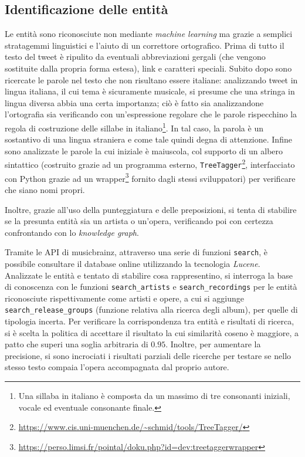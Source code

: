 \documentclass[12pt, a4paper, twocolumn]{article} %
\begin{document}
\subsection{Identificazione delle entità}
Le entità sono riconosciute non mediante \textit{machine learning} ma grazie a semplici stratagemmi linguistici e l'aiuto di un correttore ortografico.
Prima di tutto il testo del tweet è ripulito da eventuali abbreviazioni gergali (che vengono sostituite dalla propria forma estesa), link e caratteri speciali.
Subito dopo sono ricercate le parole nel testo che non risultano essere italiane: analizzando tweet in lingua italiana, il cui tema è sicuramente musicale, si presume che una stringa in lingua diversa abbia una certa importanza; ciò è fatto sia analizzandone l'ortografia sia verificando con un'espressione regolare che le parole rispecchino la regola di costruzione delle sillabe in italiano\footnote{Una sillaba in italiano è composta da un massimo di tre consonanti iniziali, vocale ed eventuale consonante finale.}.
In tal caso, la parola è un sostantivo di una lingua straniera e come tale quindi degna di attenzione.
Infine sono analizzate le parole la cui iniziale è maiuscola, col supporto di un albero sintattico (costruito grazie ad un programma esterno, \verb|TreeTagger|\footnote{\url{https://www.cis.uni-muenchen.de/~schmid/tools/TreeTagger/}}, interfacciato con Python grazie ad un wrapper\footnote{\url{https://perso.limsi.fr/pointal/doku.php?id=dev:treetaggerwrapper}} fornito dagli stessi sviluppatori) per verificare che siano nomi propri.

Inoltre, grazie all'uso della punteggiatura e delle preposizioni, si tenta di stabilire se la presunta entità sia un artista o un'opera, verificando poi con certezza confrontando con lo \textit{knowledge graph}. \newline

Tramite le API di musicbrainz, attraverso una serie di funzioni \verb|search|, è possibile consultare il database online utilizzando la tecnologia \textit{Lucene}.
Analizzate le entità e tentato di stabilire cosa rappresentino, si interroga la base di conoscenza con le funzioni \verb|search_artists| e \verb|search_recordings| per le entità riconosciute rispettivamente come artisti e opere, a cui si aggiunge \verb|search_release_groups| (funzione relativa alla ricerca degli album), per quelle di tipologia incerta.
Per verificare la corrispondenza tra entità e risultati di ricerca, si è scelta la politica di accettare il risultato la cui similarità coseno è maggiore, a patto che superi una soglia arbitraria di $0.95$.
Inoltre, per aumentare la precisione, si sono incrociati i risultati parziali delle ricerche per testare se nello stesso testo compaia l'opera accompagnata dal proprio autore.
\end{document}
